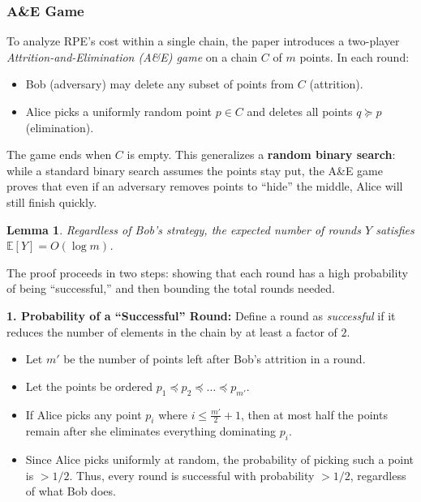 \documentclass[11pt, a4paper]{article}
\theoremstyle{boxed}
\newtheorem{innerlemma}{Lemma}[section]
\newenvironment{lemma}
  {\begin{mdframed}[style=lemstyle]\begin{innerlemma}}
  {\end{innerlemma}\end{mdframed}}
\begin{document}
\subsubsection{A\&E Game\label{sec:ae}} 
To analyze RPE's cost within a single chain, the paper introduces a two-player \emph{Attrition-and-Elimination (A\&E) game} on a chain $C$ of $m$ points. In each round:
\begin{itemize}
  \item Bob (adversary) may delete any subset of points from $C$ (attrition).
  \item Alice picks a uniformly random point $p \in C$ and deletes all points $q \succeq p$ (elimination).
\end{itemize}
The game ends when $C$ is empty. This generalizes a \textbf{random binary search}: while a standard binary search assumes the points stay put, the A\&E game proves that even if an adversary removes points to ``hide'' the middle, Alice will still finish quickly.

\begin{lemma}Regardless of Bob's strategy, the expected number of rounds $Y$ satisfies $\mathbb{E}[Y] = O(\log m)$.
\end{lemma}

\noindent The proof proceeds in two steps: showing that each round has a high probability of being ``successful,'' and then bounding the total rounds needed.

\medskip
\noindent \textbf{1. Probability of a ``Successful'' Round:} 
Define a round as \emph{successful} if it reduces the number of elements in the chain by at least a factor of $2$. 
\begin{itemize}
    \item Let $m'$ be the number of points left after Bob's attrition in a round. 
    \item Let the points be ordered $p_1 \preceq p_2 \preceq \dots \preceq p_{m'}$. 
    \item If Alice picks any point $p_i$ where $i \le \frac{m'}{2} + 1$, then at most half the points remain after she eliminates everything dominating $p_i$.
    \item Since Alice picks uniformly at random, the probability of picking such a point is $> 1/2$. Thus, every round is successful with probability $> 1/2$, regardless of what Bob does.
\end{itemize}
\end{document}

